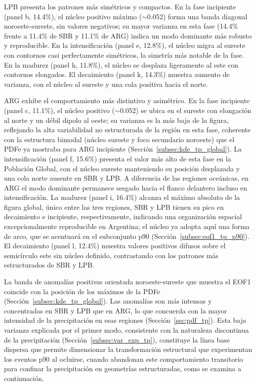 LPB presenta los patrones más simétricos y compactos. En la fase incipiente (panel b, 14.4\%), el núcleo positivo máximo ($\sim$0.052) forma una banda diagonal noroeste-sureste, sin valores negativos; su mayor varianza en esta fase (14.4\% frente a 11.4\% de SBR y 11.1\% de ARG) indica un modo dominante más robusto y reproducible. En la intensificación (panel e, 12.8\%), el núcleo migra al sureste con contornos casi perfectamente simétricos, la simetría más notable de la fase. En la madurez (panel h, 11.8\%), el núcleo se desplaza ligeramente al este con contornos elongados. El decaimiento (panel k, 14.3\%) muestra aumento de varianza, con el núcleo al sureste y una cola positiva hacia el norte.

ARG exhibe el comportamiento más distintivo y asimétrico. En la fase incipiente (panel c, 11.1\%), el núcleo positivo ($\sim$0.052) se ubica en el sureste con elongación al norte y un débil dipolo al oeste; su varianza es la más baja de la figura, reflejando la alta variabilidad no estructurada de la región en esta fase, coherente con la estructura bimodal (núcleo sureste y foco secundario noroeste) que el PDFe ya mostraba para ARG incipiente (Sección~\ref{subsec:kde_tp_global}). La intensificación (panel f, 15.6\%) presenta el valor más alto de esta fase en la Población Global, con el núcleo sureste manteniendo su posición desplazada y una cola norte ausente en SBR y LPB. A diferencia de las regiones oceánicas, en ARG el modo dominante permanece sesgado hacia el flanco delantero incluso en intensificación. La madurez (panel i, 16.4\%) alcanza el máximo absoluto de la figura global, único entre las tres regiones, SBR y LPB tienen su pico en decaimiento e incipiente, respectivamente, indicando una organización espacial excepcionalmente reproducible en Argentina; el núcleo ya adopta aquí una forma de arco, que se acentuará en el subconjunto p90 (Sección~\ref{subsec:eof1_tp_p90}). El decaimiento (panel l, 12.4\%) muestra valores positivos difusos sobre el semicírculo este sin núcleo definido, contrastando con los patrones más estructurados de SBR y LPB.

La banda de anomalías positivas orientada noroeste-sureste que muestra el EOF1 coincide con la posición de los máximos de la PDFe (Sección~\ref{subsec:kde_tp_global}). Las anomalías son más intensas y concentradas en SBR y LPB que en ARG, lo que concuerda con la mayor intensidad de la precipitación en esas regiones (Sección~\ref{sec:pdf_tp}).
Esta baja varianza explicada por el primer modo, consistente con la naturaleza discontinua de la precipitación (Sección~\ref{subsec:var_exp_tp}), constituye la línea base dispersa que permite dimensionar la transformación estructural que experimentan los eventos p90 al ocluirse, cuando abandonan este comportamiento transitorio para confinar la precipitación en geometrías estructuradas, como se examina a continuación.

